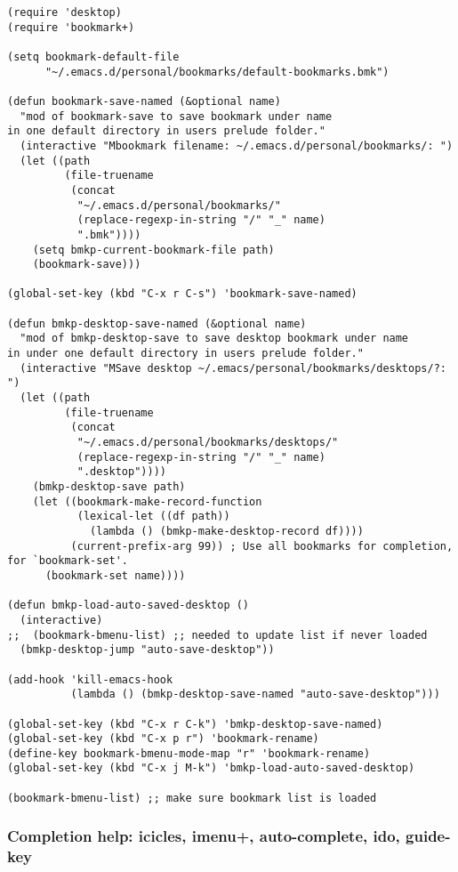 \documentclass{article}
\begin{document}
\begin{verbatim}
(require 'desktop)
(require 'bookmark+)

(setq bookmark-default-file
      "~/.emacs.d/personal/bookmarks/default-bookmarks.bmk")

(defun bookmark-save-named (&optional name)
  "mod of bookmark-save to save bookmark under name
in one default directory in users prelude folder."
  (interactive "Mbookmark filename: ~/.emacs.d/personal/bookmarks/: ")
  (let ((path
         (file-truename
          (concat
           "~/.emacs.d/personal/bookmarks/"
           (replace-regexp-in-string "/" "_" name)
           ".bmk"))))
    (setq bmkp-current-bookmark-file path)
    (bookmark-save)))

(global-set-key (kbd "C-x r C-s") 'bookmark-save-named)

(defun bmkp-desktop-save-named (&optional name)
  "mod of bmkp-desktop-save to save desktop bookmark under name
in under one default directory in users prelude folder."
  (interactive "MSave desktop ~/.emacs/personal/bookmarks/desktops/?: ")
  (let ((path
         (file-truename
          (concat
           "~/.emacs.d/personal/bookmarks/desktops/"
           (replace-regexp-in-string "/" "_" name)
           ".desktop"))))
    (bmkp-desktop-save path)
    (let ((bookmark-make-record-function
           (lexical-let ((df path))
             (lambda () (bmkp-make-desktop-record df))))
          (current-prefix-arg 99)) ; Use all bookmarks for completion, for `bookmark-set'.
      (bookmark-set name))))

(defun bmkp-load-auto-saved-desktop ()
  (interactive)
;;  (bookmark-bmenu-list) ;; needed to update list if never loaded
  (bmkp-desktop-jump "auto-save-desktop"))

(add-hook 'kill-emacs-hook
          (lambda () (bmkp-desktop-save-named "auto-save-desktop")))

(global-set-key (kbd "C-x r C-k") 'bmkp-desktop-save-named)
(global-set-key (kbd "C-x p r") 'bookmark-rename)
(define-key bookmark-bmenu-mode-map "r" 'bookmark-rename)
(global-set-key (kbd "C-x j M-k") 'bmkp-load-auto-saved-desktop)

(bookmark-bmenu-list) ;; make sure bookmark list is loaded
\end{verbatim}

\subsubsection{Completion help: icicles, imenu+, auto-complete, ido, guide-key}
\label{sec-1-11-6}
\end{document}
